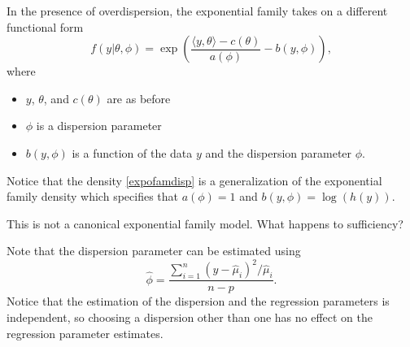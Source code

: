 \documentclass[
  ignorenonframetext,
]{beamer}
\providecommand{\tightlist}{%
  \setlength{\itemsep}{0pt}\setlength{\parskip}{0pt}}
\begin{document}
\begin{frame}{}
\protect\hypertarget{section-1}{}
In the presence of overdispersion, the exponential family takes on a
different functional form \begin{equation} \label{expofamdisp}
  f(y|\theta,\phi) = \exp\left(\frac{\langle y,\theta\rangle- c(\theta)}{a(\phi)} - b(y,\phi) \right),
\end{equation} where

\begin{itemize}
\tightlist
\item
  \(y\), \(\theta\), and \(c(\theta)\) are as before
\item
  \(\phi\) is a dispersion parameter
\item
  \(b(y,\phi)\) is a function of the data \(y\) and the dispersion
  parameter \(\phi\).
\end{itemize}

\vspace{12pt}

Notice that the density \eqref{expofamdisp} is a generalization of the
exponential family density which specifies that \(a(\phi) = 1\) and
\(b(y,\phi) = \log(h(y))\).

\vspace{12pt}

This is not a canonical exponential family model. What happens to
sufficiency?
\end{frame}

\begin{frame}{}
\protect\hypertarget{section-2}{}
Note that the dispersion parameter can be estimated using \[
  \hat{\phi} = \frac{\sum_{i=1}^n(y - \hat\mu_i)^2/\hat\mu_i}{n-p}.
\] Notice that the estimation of the dispersion and the regression
parameters is independent, so choosing a dispersion other than one has
no effect on the regression parameter estimates.
\end{frame}
\end{document}
